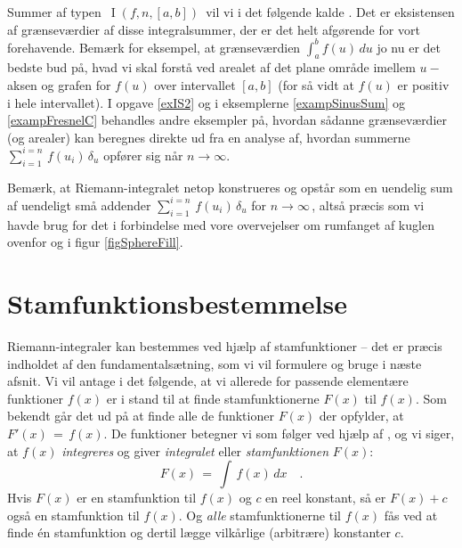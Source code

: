 Summer af typen $\,\operatorname{I}(f, n, [a,b])\,$ vil vi
i det følgende kalde
.
Det er eksistensen af grænseværdier af disse integralsummer, der er det helt afgørende for vort forehavende. Bemærk for eksempel, at
grænseværdien $\int_{a}^{b} f(u)\, du$ jo nu er det bedste bud på, hvad vi skal forstå ved arealet af det plane  område
imellem $u-$aksen og grafen for $f(u)$ over intervallet $[a, b]$ (for så vidt at $f(u)$ er positiv i hele intervallet).
I opgave \ref{exIS2} og i eksemplerne \ref{exampSinusSum} og \ref{exampFresnelC} behandles andre eksempler på, hvordan sådanne grænseværdier (og arealer) kan beregnes direkte ud fra en analyse af, hvordan summerne $\sum_{i=1}^{i=n}\, f\left(u_{i}\right)\,\delta_{u}$ opfører sig når $n \to \infty$.\\

\begin{aha}
Bemærk, at
Riemann-integralet netop konstrueres og opstår som en uendelig sum af uendeligt små addender $\sum_{i=1}^{i=n}\, f\left(u_{i}\right)\,\delta_{u}$ for $n \to \infty\,$, altså
præcis som vi havde brug for det i forbindelse med vore overvejelser om rumfanget af kuglen ovenfor
og i figur \ref{figSphereFill}.
\end{aha}








\section{Stamfunktionsbestemmelse} \label{secStamfunk}
Riemann-integraler kan bestemmes ved hjælp af stamfunktioner -- det er præcis indholdet af den fundamentalsætning, som vi vil formulere og bruge i næste afsnit. Vi vil antage i det følgende,
at vi allerede for passende elementære funktioner $f(x)$
er i stand til at finde stamfunktionerne $F(x)$ til $f(x)$. Som bekendt går det ud på at finde alle de
funktioner $F(x)$ der opfylder, at $F'(x) \,= \, f(x)$. De funktioner  betegner vi som følger ved hjælp af , og vi siger, at  $f(x)$ {\emph{integreres}} og giver {\emph{integralet}} eller \emph{stamfunktionen} $F(x)$:
\begin{equation}
F(x) \, = \, \int \, f(x)\,dx \quad .
\end{equation}
Hvis $F(x)$ er en stamfunktion til $f(x)$ og $c$ en reel konstant, så er $F(x) + c$ også en stamfunktion til $f(x)$. Og {\emph{alle}} stamfunktionerne til $f(x)$ fås ved at finde \'{e}n stamfunktion og dertil lægge vilkårlige (arbitrære) konstanter $c$. \\

